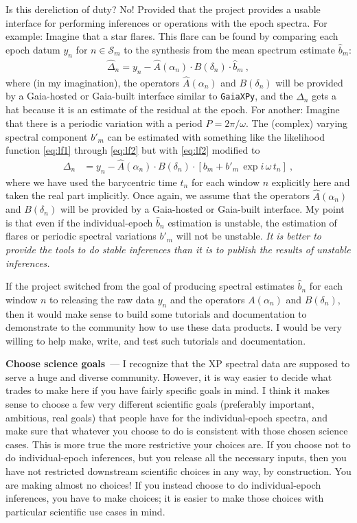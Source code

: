 \documentclass[11pt]{article}
\renewcommand{\paragraph}[1]{\medskip\par\noindent\textbf{#1}~---}
\begin{document}
Is this dereliction of duty? No! Provided that the project provides a usable interface for performing inferences or operations with the epoch spectra.
For example: Imagine that a star flares. This flare can be found by comparing each epoch datum $y_n$ for $n\in\mathscr{S}_m$ to the synthesis from the mean spectrum estimate $\hat{b}_m$:
\begin{align}
    \hat{\Delta}_n = y_n - \hat{A}(\alpha_n)\cdot B(\delta_n)\cdot \hat{b}_m ~,
\end{align}
where (in my imagination), the operators $\hat{A}(\alpha_n)$ and $B(\delta_n)$ will be provided by a Gaia-hosted or Gaia-built interface similar to \texttt{GaiaXPy},
and the $\hat{\Delta}_n$ gets a hat because it is an estimate of the residual at the epoch.
For another: Imagine that there is a periodic variation with a period $P=2\pi/\omega$.
The (complex) varying spectral component $b'_m$ can be estimated with something like the likelihood function \eqref{eq:lf1} through \eqref{eq:lf2} but with \eqref{eq:lf2} modified to
\begin{align}
    \Delta_n &= y_n - \hat{A}(\alpha_n)\cdot B(\delta_n)\cdot [b_m + b'_m\,\exp{i\,\omega\,t_n}] ~,
\end{align}
where we have used the barycentric time $t_n$ for each window $n$ explicitly here and taken the real part implicitly.
Once again, we assume that the operators $\hat{A}(\alpha_n)$ and $B(\delta_n)$ will be provided by a Gaia-hosted or Gaia-built interface.
My point is that even if the individual-epoch $\hat{b}_n$ estimation is unstable, the estimation of flares or periodic spectral variations $b'_m$ will not be unstable.
\emph{It is better to provide the tools to do stable inferences than it is to publish the results of unstable inferences.}

If the project switched from the goal of producing spectral estimates $\hat{b}_n$ for each window $n$ to releasing the raw data $y_n$ and the operators $A(\alpha_n)$ and $B(\delta_n)$, then it would make sense to build some tutorials and documentation to demonstrate to the community how to use these data products.
I would be very willing to help make, write, and test such tutorials and documentation.

\paragraph{Choose science goals}
I recognize that the XP spectral data are supposed to serve a huge and diverse community.
However, it is way easier to decide what trades to make here if you have fairly specific goals in mind.
I think it makes sense to choose a few very different scientific goals (preferably important, ambitious, real goals) that people have for the individual-epoch spectra, and make sure that whatever you choose to do is consistent with those chosen science cases.
This is more true the more restrictive your choices are.
If you choose not to do individual-epoch inferences, but you release all the necessary inputs, then you have not restricted downstream scientific choices in any way, by construction. You are making almost no choices!
If you instead choose to do individual-epoch inferences, you have to make choices; it is easier to make those choices with particular scientific use cases in mind.
\end{document}
